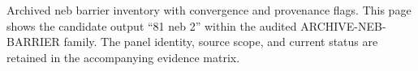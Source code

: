 Archived neb barrier inventory with convergence and provenance flags. This page shows the candidate output ``81 neb 2'' within the audited ARCHIVE-NEB-BARRIER family. The panel identity, source scope, and current status are retained in the accompanying evidence matrix.
